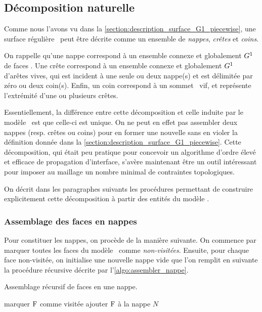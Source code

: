 \subsection{Décomposition naturelle}
Comme nous l'avons vu dans la \autoref{section:description_surface_G1_piecewise}, une surface régulière \piecewise\ peut être décrite comme un ensemble de \textit{nappes}, \textit{crêtes} et \textit{coins}. \par 
On rappelle qu'une nappe correspond à un ensemble connexe et globalement $G^{1}$ de faces \brep. 
Une crête correspond à un ensemble connexe et globalement $G^{1}$ d'arêtes vives, qui est incident à une seule ou deux nappe(s) et est délimitée par zéro ou deux coin(s).
Enfin, un coin correspond à un sommet \brep\ vif, et représente l'extrémité d'une ou plusieurs crêtes.\par
Essentiellement, la différence entre cette décomposition  et celle induite par le modèle \brep\ est que celle-ci est unique. 
On ne peut en effet pas assembler deux nappes (resp. crêtes ou coins) pour en former une nouvelle sans en violer la définition donnée dans la \autoref{section:description_surface_G1_piecewise}. 
Cette décomposition, qui était peu pratique pour concevoir un algorithme d'ordre élevé et efficace de propagation d'interface, s'avère maintenant être un outil intéressant pour imposer au maillage un nombre minimal de contraintes topologiques.\par
On décrit dans les paragraphes suivants les procédures permettant de construire explicitement cette décomposition à partir des entités du modèle \brep.

\subsubsection{Assemblage des faces en nappes}
Pour constituer les nappes, on procède de la manière suivante. 
On commence par marquer toutes les faces du modèle \brep\ comme \textit{non-visitées}. 
Ensuite, pour chaque face non-visitée, on initialise une nouvelle nappe vide que l'on remplit en suivante la procédure récursive décrite par l'\autoref{algo:assembler_nappe}.

\begin{algorithm}
	\caption{Assemblage récursif de faces en une nappe.}\label{algo:assembler_nappe}
	\begin{algorithmic}[1]
			\State marquer $\mathrm{F}$ comme visitée
			\State ajouter $\mathrm{F}$ à la nappe $N$
						\State {}
					\EndIf
				\EndFor
			\EndFor
		\EndProcedure
	\end{algorithmic}
\end{algorithm}


